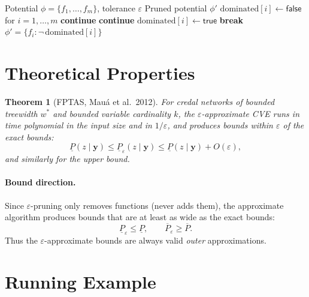 \documentclass[11pt]{article}
\newtheorem{theorem}{Theorem}
\begin{document}
\begin{algorithm}[H]
\caption{$\varepsilon$-Prune}
\label{alg:eps-prune}
\begin{algorithmic}[1]
\Require Potential $\phi = \{f_1, \dots, f_m\}$, tolerance $\varepsilon$
\Ensure Pruned potential $\phi'$
\State $\mathrm{dominated}[i] \gets \mathsf{false}$ for $i = 1, \dots, m$
   \textbf{continue} \EndIf
     \textbf{continue} \EndIf
      \State $\mathrm{dominated}[i] \gets \mathsf{true}$
      \State \textbf{break}
    \EndIf
  \EndFor
\EndFor
\State \Return $\phi' = \{f_i : \neg\,\mathrm{dominated}[i]\}$
\end{algorithmic}
\end{algorithm}

\section{Theoretical Properties}

\begin{theorem}[FPTAS, Mau\'a et al.\ 2012]
For credal networks of bounded treewidth $w^*$ and bounded variable cardinality $k$,
the $\varepsilon$-approximate CVE runs in time polynomial in the input size and in
$1/\varepsilon$, and produces bounds within $\varepsilon$ of the exact bounds:
\[
  \underline{P}(z \mid \mathbf{y}) \leq \underline{P}_\varepsilon(z \mid \mathbf{y})
  \leq \underline{P}(z \mid \mathbf{y}) + O(\varepsilon),
\]
and similarly for the upper bound.
\end{theorem}

\paragraph{Bound direction.}
Since $\varepsilon$-pruning only removes functions (never adds them), the approximate
algorithm produces bounds that are at least as wide as the exact bounds:
\[
  \underline{P}_\varepsilon \leq \underline{P}, \qquad
  \overline{P}_\varepsilon \geq \overline{P}.
\]
Thus the $\varepsilon$-approximate bounds are always valid \emph{outer} approximations.

\section{Running Example}
\end{document}
